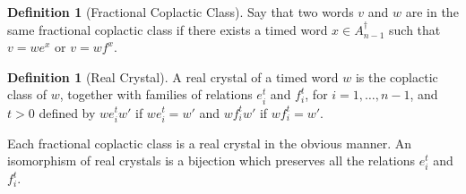 \documentclass[12pt]{amsproc}
\theoremstyle{definition}
\newtheorem{definition}[theorem]{Definition}
\begin{document}
\begin{definition}[Fractional Coplactic Class]
  Say that two words $v$ and $w$ are in the same fractional coplactic class if there exists a timed word $x\in A_{n-1}^\dagger$ such that $v=we^x$ or $v=wf^x$.
\end{definition}
\begin{definition}[Real Crystal]
  A real crystal of a timed word $w$ is the coplactic class of $w$, together with families of relations $e_i^t$ and $f_i^t$, for $i=1,\dotsc,n-1$, and $t>0$ defined by $we_i^t w'$ if $we_i^t = w'$ and $wf_i^tw'$ if $wf_i^t=w'$.
\end{definition}
Each fractional coplactic class is a real crystal in the obvious manner.
An isomorphism of real crystals is a bijection which preserves all the relations $e_i^t$ and $f_i^t$.
\end{document}
